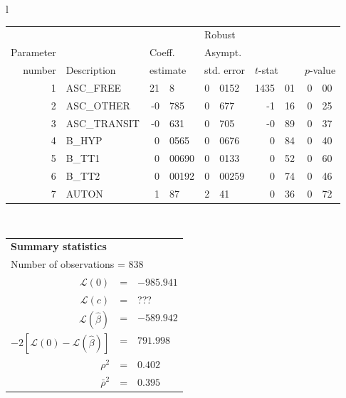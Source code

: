   \begin{tabular}{l}
\begin{tabular}{rlr@{.}lr@{.}lr@{.}lr@{.}l}
         &                       &   \multicolumn{2}{l}{}    & \multicolumn{2}{l}{Robust}  &     \multicolumn{4}{l}{}   \\
Parameter &                       &   \multicolumn{2}{l}{Coeff.}      & \multicolumn{2}{l}{Asympt.}  &     \multicolumn{4}{l}{}   \\
number &  Description                     &   \multicolumn{2}{l}{estimate}      & \multicolumn{2}{l}{std. error}  &   \multicolumn{2}{l}{$t$-stat}  &   \multicolumn{2}{l}{$p$-value}   \\

\hline

1 & ASC\_FREE & 21&8 & 0&0152 & 1435&01 & 0&00 \\
2 & ASC\_OTHER & -0&785 & 0&677 & -1&16 & 0&25 \\
3 & ASC\_TRANSIT & -0&631 & 0&705 & -0&89 & 0&37 \\
4 & B\_HYP & 0&0565 & 0&0676 & 0&84 & 0&40 \\
5 & B\_TT1 & 0&00690 & 0&0133 & 0&52 & 0&60 \\
6 & B\_TT2 & 0&00192 & 0&00259 & 0&74 & 0&46 \\
\hline
7 & AUTON & 1&87 & 2&41 & 0&36\footnotemark[1] & 0&72 \\
\hline

\end{tabular}
\\
\begin{tabular}{rcl}
\multicolumn{3}{l}{\bf Summary statistics}\\
\multicolumn{3}{l}{ Number of observations = $838$} \\
 $\mathcal{L}(0)$ &=&  $-985.941$ \\
 $\mathcal{L}(c)$ &=& ???\\
 $\mathcal{L}(\hat{\beta})$ &=& $-589.942 $  \\
 $-2[\mathcal{L}(0) -\mathcal{L}(\hat{\beta})]$ &=& $791.998$ \\
    $\rho^2$ &=&   $0.402$ \\
    $\bar{\rho}^2$ &=&    $0.395$ \\
\end{tabular}
\end{tabular}

